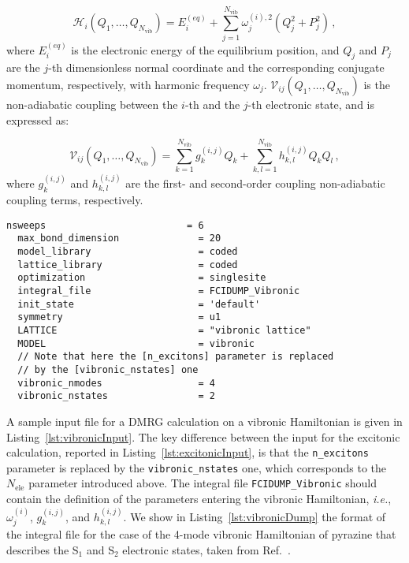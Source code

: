 \documentclass[bibliography=totoc,12pt,a4paper]{scrartcl}
\begin{document}
\begin{equation}
  \mathcal{H}_{i}(Q_1,\ldots,Q_{N_\text{vib}}) = E_i^{(eq)}
	+ \sum_{j=1}^{N_\text{vib}} \omega_j^{(i),2} \left( Q_j^2  + P_j^2 \right) \, ,
  \label{eq:DiagonalVibronic}
\end{equation}
%
where $E_i^{(eq)}$ is the electronic energy of the equilibrium position, and $Q_j$ and $P_j$ are the $j$-th dimensionless  normal coordinate and the corresponding conjugate momentum, respectively, with harmonic frequency $\omega_j$.
$\mathcal{V}_{ij}(Q_1,\ldots,Q_{N_\text{vib}})$ is the non-adiabatic coupling between the $i$-th and the $j$-th electronic state, and is expressed as:

\begin{equation}
  \mathcal{V}_{ij}(Q_1,\ldots,Q_{N_\text{vib}}) =
   \sum_{k=1}^{N_\text{vib}} g_k^{(i,j)} Q_k
	+ \sum_{k,l=1}^{N_\text{vib}} h_{k,l}^{(i,j)} Q_k Q_l \, ,
  \label{eq:OffDiagonalVibronic}
\end{equation}
%
where $g_k^{(i,j)}$ and $h_{k,l}^{(i,j)}$ are the first- and second-order coupling non-adiabatic coupling terms, respectively.

\begin{lstlisting}[language=qcmaquis,
				   caption={Input example for a vibronic DMRG calculation},
				   label=lst:vibronicInput]
  nsweeps                         = 6
  max_bond_dimension              = 20
  model_library                   = coded
  lattice_library                 = coded
  optimization                    = singlesite
  integral_file                   = FCIDUMP_Vibronic
  init_state                      = 'default'
  symmetry                        = u1
  LATTICE                         = "vibronic lattice"
  MODEL                           = vibronic
  // Note that here the [n_excitons] parameter is replaced 
  // by the [vibronic_nstates] one
  vibronic_nmodes                 = 4
  vibronic_nstates                = 2
\end{lstlisting}

A sample input file for a DMRG calculation on a vibronic Hamiltonian is given in Listing~\ref{lst:vibronicInput}.
The key difference between the input for the excitonic calculation, reported in Listing~\ref{lst:excitonicInput}, is that the \texttt{n\_excitons} parameter is replaced by the \texttt{vibronic\_nstates} one, which corresponds to the $N_\text{ele}$ parameter introduced above.
The integral file \texttt{FCIDUMP\_Vibronic} should contain the definition of the parameters entering the vibronic Hamiltonian, \textit{i.e.}, $\omega_j^{(i)}$, $g_k^{(i,j)}$, and $h_{k,l}^{(i,j)}$.
We show in Listing~\ref{lst:vibronicDump} the format of the integral file for the case of the 4-mode vibronic Hamiltonian of pyrazine that describes the S$_1$ and S$_2$ electronic states, taken from Ref.~.
\end{document}
